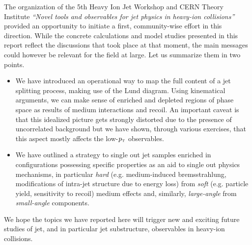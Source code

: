 The organization of the 5th Heavy Ion Jet Workshop and CERN Theory Institute {\sl ``Novel tools and observables for jet physics in heavy-ion collisions''} provided an opportunity to initiate a first, community-wise effort in this direction.
While the concrete calculations and model studies presented in this report reflect the discussions that took place at that moment, the main messages could however be relevant for the field at large. Let us summarize them in two points.
\begin{itemize}

\item We have introduced an operational way to map the full content of a jet splitting process, making use of the Lund diagram. Using kinematical arguments, we can make sense of enriched and depleted regions of phase space as results of medium interactions and recoil. An important caveat is that this idealized picture gets strongly distorted due to the presence of uncorrelated background but we have shown, through various exercises, that this aspect mostly affects the low-$p_{\text{\tiny T}}$ observables.

\item We have outlined a strategy to single out jet samples enriched in configurations possessing specific properties as an aid to single out physics mechanisms, in particular \textsl{hard} (e.g. medium-induced bremsstrahlung, modifications of intra-jet structure due to energy loss) from \textsl{soft} (e.g. particle yield, sensitivity to recoil) medium effects and, similarly, \textsl{large-angle} from \textsl{small-angle} components.

\end{itemize}
We hope the topics we have reported here will trigger new and exciting future studies of jet, and in particular jet substructure, observables in heavy-ion collisions.

